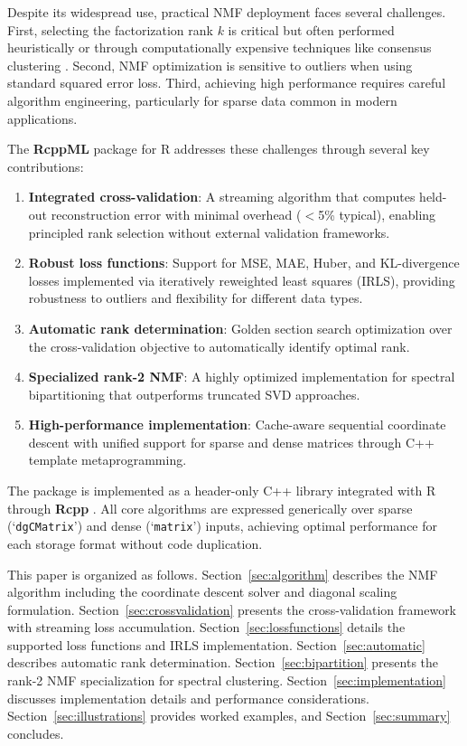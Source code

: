 \documentclass[11pt]{article}
\newcommand{\proglang}[1]{\textsf{#1}}
\newcommand{\pkg}[1]{\textbf{#1}}
\newcommand{\code}[1]{\texttt{#1}}
\newcommand{\class}[1]{`\code{#1}'}
\begin{document}
Despite its widespread use, practical NMF deployment faces several challenges. 
First, selecting the factorization rank $k$ is critical but often performed 
heuristically or through computationally expensive techniques like consensus 
clustering \citep{Brunet2004}. Second, NMF optimization is sensitive to outliers 
when using standard squared error loss. Third, achieving high performance 
requires careful algorithm engineering, particularly for sparse data common in 
modern applications.

The \pkg{RcppML} package for \proglang{R} addresses these challenges through 
several key contributions:

\begin{enumerate}
  \item \textbf{Integrated cross-validation}: A streaming algorithm that 
  computes held-out reconstruction error with minimal overhead ($<$5\% typical), 
  enabling principled rank selection without external validation frameworks.
  
  \item \textbf{Robust loss functions}: Support for MSE, MAE, Huber, and 
  KL-divergence losses implemented via iteratively reweighted least squares 
  (IRLS), providing robustness to outliers and flexibility for different data 
  types.
  
  \item \textbf{Automatic rank determination}: Golden section search 
  optimization over the cross-validation objective to automatically identify 
  optimal rank.
  
  \item \textbf{Specialized rank-2 NMF}: A highly optimized implementation for 
  spectral bipartitioning that outperforms truncated SVD approaches.
  
  \item \textbf{High-performance implementation}: Cache-aware sequential 
  coordinate descent with unified support for sparse and dense matrices through 
  \proglang{C++} template metaprogramming.
\end{enumerate}

The package is implemented as a header-only \proglang{C++} library integrated 
with \proglang{R} through \pkg{Rcpp} \citep{Eddelbuettel2011, Eddelbuettel2013}. 
All core algorithms are expressed generically over sparse 
(\class{dgCMatrix}) and dense (\class{matrix}) inputs, achieving optimal 
performance for each storage format without code duplication.

This paper is organized as follows. Section~\ref{sec:algorithm} describes the 
NMF algorithm including the coordinate descent solver and diagonal scaling 
formulation. Section~\ref{sec:crossvalidation} presents the cross-validation 
framework with streaming loss accumulation. Section~\ref{sec:lossfunctions} 
details the supported loss functions and IRLS implementation. 
Section~\ref{sec:automatic} describes automatic rank determination. 
Section~\ref{sec:bipartition} presents the rank-2 NMF specialization for 
spectral clustering. Section~\ref{sec:implementation} discusses implementation 
details and performance considerations. Section~\ref{sec:illustrations} provides 
worked examples, and Section~\ref{sec:summary} concludes.
\end{document}
